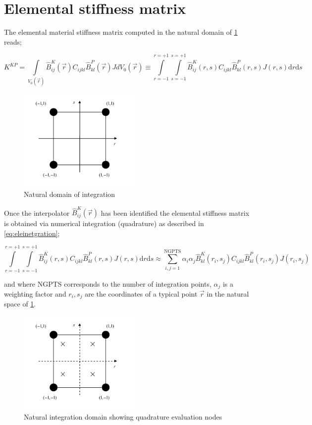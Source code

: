 \section*{Elemental stiffness matrix}
The elemental material stiffness matrix computed in the natural domain of \cref{fig:Nat domain} reads;

\begin{equation}
K^{KP}=\int\limits_{V_0(\vec{r})} \hat{B}_{ij}^K(\vec{r}) C_{ijkl} \hat{B}_{kl}^P(\vec{r})J dV_0(\vec{r})\equiv \int\limits_{r=-1}^{r=+1}\int\limits_{s=-1}^{s=+1} \hat{B}_{ij}^K(r,s) C_{ijkl} \hat{B}_{kl}^P(r,s)J(r,s) \mathrm{d}r\mathrm{d}s
\label{eq:elematrix}
\end{equation}



\begin{figure}[h]
\centering
\includegraphics[width=6cm]{img/figure3.pdf}
\caption{Natural domain of integration}
\label{fig:Nat domain}
\end{figure}	 		
 

Once the interpolator $\hat{B}_{ij}^K(\vec{r})$ has been identified the elemental stiffness matrix is obtained via numerical integration (quadrature) as described in \eqref{eq:eleinetgration};

\begin{equation}
\int\limits_{r=-1}^{r=+1}\int\limits_{s=-1}^{s=+1} \hat{B}_{ij}^K(r,s) C_{ijkl} \hat{B}_{kl}^P(r,s)J(r,s) \mathrm{d}r\mathrm{d}s\approx \sum_{i,j=1}^\text{NGPTS} \alpha_i \alpha_j \hat{B}_{kl}^K(r_i,s_j)C_{ijkl} \hat{B}_{kl}^P(r_i,s_j) J(r_i,s_j)
\label{eq:eleinetgration}
\end{equation}

	 											
and where NGPTS corresponds to the number of integration points, $\alpha_j$ is a weighting factor and $r_i,s_j$   are the coordinates of a typical point $\vec{r}$ in the natural space of \cref{fig:Nat domain}.

 
\begin{figure}[h]
\centering
\includegraphics[width=6cm]{img/figure4.pdf}
\caption{Natural integration domain showing quadrature evaluation nodes}
\label{fig:integration domain}
\end{figure}	 


